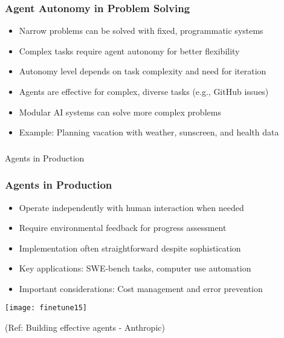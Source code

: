\begin{frame}[fragile]\frametitle{Agent Autonomy in Problem Solving}
\begin{itemize}
    \item Narrow problems can be solved with fixed, programmatic systems
    \item Complex tasks require agent autonomy for better flexibility
    \item Autonomy level depends on task complexity and need for iteration
    \item Agents are effective for complex, diverse tasks (e.g., GitHub issues)
    \item Modular AI systems can solve more complex problems
    \item Example: Planning vacation with weather, sunscreen, and health data
\end{itemize}
\end{frame}

\begin{frame}[fragile]\frametitle{}
\begin{center}
{\Large Agents in Production}
\end{center}
\end{frame}

\begin{frame}[fragile]\frametitle{Agents in Production}
\begin{itemize}
    \item Operate independently with human interaction when needed
    \item Require environmental feedback for progress assessment
    \item Implementation often straightforward despite sophistication
    \item Key applications: SWE-bench tasks, computer use automation
    \item Important considerations: Cost management and error prevention
\end{itemize}

\begin{center}
\texttt{[image: finetune15]}
\end{center}

{\tiny (Ref: Building effective agents - Anthropic)}
\end{frame}

